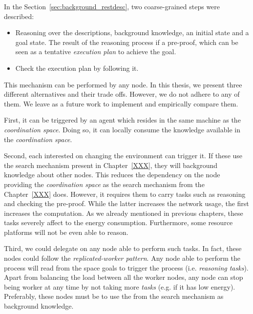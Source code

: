 In the Section~\ref{sec:background_restdesc}, two coarse-grained steps were described:
\begin{itemize}
  \item Reasoning over the descriptions, background knowledge, an initial state and a goal state.
        The result of the reasoning process if a pre-proof, which can be seen as a tentative \emph{execution plan} to achieve the goal.
  \item Check the execution plan by following it.
\end{itemize}


This mechanism can be performed by any node.
In this thesis, we present three different alternatives and their trade offs.
However, we do not adhere to any of them.
We leave as a future work to implement and empirically compare them.


First, it can be triggered by an agent which resides in the same machine as the \emph{coordination space}.
Doing so, it can locally consume the knowledge available in the \emph{coordination space}.


Second, each \consumer{} interested on changing the environment can trigger it.
If these \consumers{} use the search mechanism present in Chapter~\ref{XXX}, they will background knowledge about other nodes.
This reduces the dependency on the node providing the \emph{coordination space} as the search mechanism from the Chapter~\ref{XXX} does.
However, it requires them to carry tasks such as reasoning and checking the pre-proof.
While the latter increases the network usage, the first increases the computation.
As we already mentioned in previous chapters, these tasks severely affect to the energy consumption.
Furthermore, some resource platforms will not be even able to reason.


Third, we could delegate on any node able to perform such tasks.
In fact, these nodes could follow the \emph{replicated-worker pattern}.
Any node able to perform the process will read from the space goals to trigger the process (i.e. \emph{reasoning tasks}).
Apart from balancing the load between all the worker nodes, any node can stop being worker at any time by not taking more \emph{tasks} (e.g. if it has low energy).
Preferably, these nodes must be \consumers{} to use the \clues{} from the search mechanism as background knowledge.






